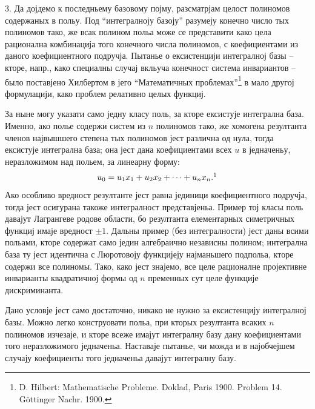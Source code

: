 \documentclass[11pt]{article}
\begin{document}
3. Да дојдемо к последньему базовому појму, разсматрјам целост полиномов содержаных в польу. Под ``интегралноју базоју'' разумеју конечно число тых полиномов тако, же всак полином польа може се представити како цела рационална комбинација того конечного числа полиномов, с коефициентами из даного коефициентного подручја. Пытанье о ексистенцији интегралној базы -- кторе, напр., како специалны случај вкльуча конечност система инвариантов -- было поставјено Хилбертом в јего ``Математичных проблемах''\footnote{D. Hilbert: Mathematische Probleme. Doklad, Paris 1900. Problem 14. Göttinger Nachr. 1900.} в мало другој формулацији, како проблем релативно целых функциј.

За ныне могу указати само једну класу поль, за кторе ексистује интегрална база. Именно, ако полье содержи систем из $n$ полиномов тако, же хомогена резултанта членов највышшего степена тых полиномов јест различна од нула, тогда ексистује интегрална база; она јест дана коефициентами всех $u$ в једначеньу, неразложимом над польем, за линеарну форму:
\[
  u_0=u_1x_1+u_2x_2+\cdots+u_nx_n.\footnotemark
\]
Ако особливо вредност резултанте јест равна јединици коефициентного подручја, тогда јест осигурана такоже интегралност представјеньа. Пример тој класы поль давајут Лагрангеве родове области, бо резултанта елементарных симетричных функциј имаје вредност $\pm 1$. Дальны пример (без интегралности) јест даны всими польами, кторе содержат само једин алгебраично независны полином; интегрална база ту јест идентична с Люротовоју функцијеју најманьшего подпольа, кторе содержи все полиномы. Тако, како јест знајемо, все целе рационалне пројективне инварианты квадратичној формы од $n$ пременных сут целе функције дискриминанта.

Дано условје јест само достаточно, никако не нужно за ексистенцију интегралној базы. Можно легко конструовати польа, при кторых резултанта всаких $n$ полиномов изчезаје, и кторе всеже имајут интегралну базу дану коефициентами того неразложимого једначеньа. Наставаје пытанье, чи можда и в најобчејшем случају коефициенты того једначеньа давајут интегралну базу.
\end{document}
